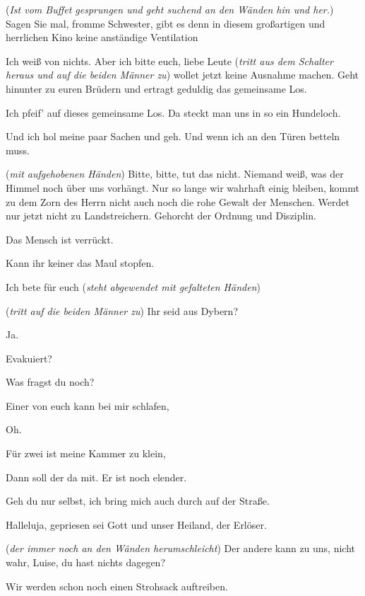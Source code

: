 \documentclass[
	final,
	a4paper,
	ngerman,
	mpinclude = true, %
	twoside = true,
	open = right,
	cleardoublepage = plain,
	DIV = 13,
	BCOR = 1cm,
	titlepage = firstiscover,
	]{scrbook}
\newcommand{\direction}[1]{(\textit{#1})}
\newcommand{\thecharacter}[1]{\textup{\textsc{#1}}\xspace}
\newcommand{\theGregor}{\thecharacter{Gregor}}
\newcommand{\theJan}{\thecharacter{Jan}}
\newcommand{\theLuise}{\thecharacter{Luise}}
\newcommand{\character}[1]{\item[#1]}
\newcommand{\Gregor}{\character{\theGregor}}
\newcommand{\Jan}{\character{\theJan}}
\newcommand{\Luise}{\character{\theLuise}}
\newcommand{\Heilsarmeeschwester}{\character{Schwester}}
\newcommand{\ErsterMann}{\character{1. Mann}}
\newcommand{\ZweiterMann}{\character{2. Mann}}
\begin{document}
\begin{play}
\Jan
\direction{Ist vom Buffet gesprungen und geht suchend an den Wänden hin und her.} Sagen Sie mal, fromme Schwester, gibt es denn in diesem großartigen und herrlichen Kino keine anständige Ventilation

\Heilsarmeeschwester
Ich weiß von nichts. Aber ich bitte euch, liebe Leute \direction{tritt aus dem Schalter heraus und auf die beiden Männer zu} wollet jetzt keine Ausnahme machen. Geht hinunter zu euren Brüdern und ertragt geduldig das gemeinsame Los.

\ErsterMann
Ich pfeif' auf dieses gemeinsame Los. Da steckt man uns in so ein Hundeloch.

\ZweiterMann
Und ich hol meine paar Sachen und geh. Und wenn ich an den Türen betteln muss.

\Heilsarmeeschwester
\direction{mit aufgehobenen Händen} Bitte, bitte, tut das nicht. Niemand weiß, was der Himmel noch über uns vorhängt. Nur so lange wir wahrhaft einig bleiben, kommt zu dem Zorn des Herrn nicht auch noch die rohe Gewalt der Menschen. Werdet nur jetzt nicht zu Landstreichern. Gehorcht der Ordnung und Disziplin.

\ErsterMann
Das Mensch ist verrückt.

\ZweiterMann
Kann ihr keiner das Maul stopfen.

\Heilsarmeeschwester
Ich bete für euch \direction{steht abgewendet mit gefalteten Händen}

\Gregor
\direction{tritt auf die beiden Männer zu} Ihr seid aus Dybern?

\ErsterMann
Ja.

\Gregor
Evakuiert?

\ErsterMann
Was fragst du noch?

\Gregor
Einer von euch kann bei mir schlafen,

\ErsterMann
Oh.

\Gregor
Für zwei ist meine Kammer zu klein,

\ErsterMann
Dann soll der da mit. Er ist noch elender.

\ZweiterMann
Geh du nur selbst, ich bring mich auch durch auf der Straße.

\Heilsarmeeschwester
Halleluja, gepriesen sei Gott und unser Heiland, der Erlöser.

\Jan
\direction{der immer noch an den Wänden herumschleicht} Der andere kann zu uns, nicht wahr, Luise, du hast nichts dagegen?

\Luise
Wir werden schon noch einen Strohsack auftreiben.


\end{play}
\end{document}
